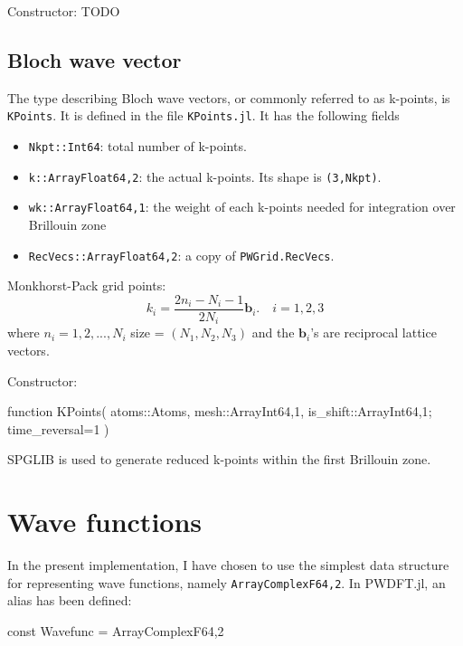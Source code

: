 \documentclass[a4paper,12pt]{article}
\newcommand{\jlcode}[1]{\texttt{#1}}
\begin{document}
Constructor: TODO

\subsection{Bloch wave vector}

The type describing Bloch wave vectors, or commonly referred
to as k-points, is \jlcode{KPoints}. It is defined in the file
\jlcode{KPoints.jl}. It has the following fields
%
\begin{itemize}
%
\item \jlcode{Nkpt::Int64}: total number of k-points.
%
\item \jlcode{k::Array{Float64,2}}: the actual k-points.
  Its shape is \jlcode{(3,Nkpt)}.
%
\item \jlcode{wk::Array{Float64,1}}: the weight of each k-points needed
  for integration over Brillouin zone
%
\item \jlcode{RecVecs::Array{Float64,2}}: a copy of \jlcode{PWGrid.RecVecs}.
\end{itemize}

Monkhorst-Pack grid points:
%
\begin{equation}
k_{i} = \frac{2n_i -N_i - 1}{2N_i} \mathbf{b}_i.\hspace{1em}
i = 1,2,3
\end{equation}
%
where $n_i=1,2,...,N_{i}$
size = \((N_1, N_2, N_3)\) and the \(\mathbf{b}_i\)'s are reciprocal lattice vectors.


Constructor:

\begin{juliacode}
function KPoints( atoms::Atoms, mesh::Array{Int64,1},
                  is_shift::Array{Int64,1};
                  time_reversal=1 )
\end{juliacode}

SPGLIB is used to generate reduced k-points within the first Brillouin zone.


\section{Wave functions}

In the present implementation, I have chosen to use the simplest
data structure for representing wave functions, namely
\jlcode{Array{ComplexF64,2}}. In \textsf{PWDFT.jl}, an alias
has been defined:
\begin{juliacode}
const Wavefunc = Array{ComplexF64,2}
\end{juliacode}
\end{document}
